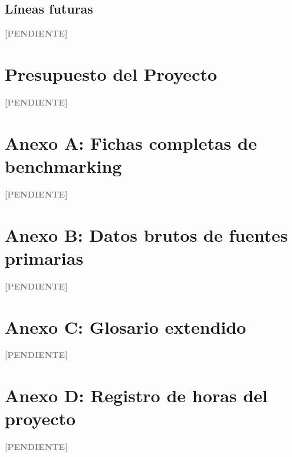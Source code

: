 \documentclass[12pt,a4paper]{article}
\newenvironment{pendiente}
  {\par\vspace{4pt}\noindent\textcolor{gray}{\textbf{[PENDIENTE]}}\par\begingroup\color{gray}\small}
  {\endgroup\par\vspace{4pt}}
\begin{document}
\subsection{Líneas futuras}
\begin{pendiente}
\end{pendiente}



\section{Presupuesto del Proyecto}
\begin{pendiente}
\end{pendiente}



\printbibliography



\section*{Anexo A: Fichas completas de benchmarking}
\begin{pendiente}
\end{pendiente}

\section*{Anexo B: Datos brutos de fuentes primarias}
\begin{pendiente}
\end{pendiente}

\section*{Anexo C: Glosario extendido}
\begin{pendiente}
\end{pendiente}

\section*{Anexo D: Registro de horas del proyecto}
\begin{pendiente}
\end{pendiente}
\end{document}
